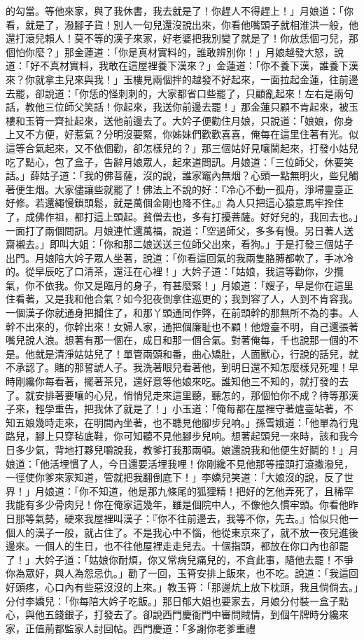 的勾當。等他來家，與了我休書，我去就是了！你趕人不得趕上！」月娘道：「你看，就是了，潑腳子貨！別人一句兒還沒說出來，你看他嘴頭子就相淮洪一般，他還打滾兒賴人！莫不等的漢子來家，好老婆把我別變了就是了！你放恁個刁兒，那個怕你麼？」那金蓮道：「你是真材實料的，誰敢辨別你！」月娘越發大怒，說道：「好不真材實料，我敢在這屋裡養下漢來？」金蓮道：「你不養下漢，誰養下漢來？你就拿主兒來與我！」玉樓見兩個拌的越發不好起來，一面拉起金蓮，往前邊去罷，卻說道：「你恁的怪刺刺的，大家都省口些罷了，只顧亂起來！左右是兩句話，教他三位師父笑話！你起來，我送你前邊去罷！」那金蓮只顧不肯起來，被玉樓和玉筲一齊扯起來，送他前邊去了。大妗子便勸住月娘，只說道：「娘娘，你身上又不方便，好惹氣？分明沒要緊，你姊妹們歡歡喜喜，俺每在這里住著有光。似這等合氣起來，又不依個勸，卻怎樣兒的？」那三個姑好見嚷鬧起來，打發小姑兒吃了點心，包了盒子，告辭月娘眾人，起來道問訊。月娘道：「三位師父，休要笑話。」薛姑子道：「我的佛菩薩，沒的說，誰家竈內無烟？心頭一點無明火，些兒觸著便生烟。大家儘讓些就罷了！佛法上不說的好：『冷心不動一孤舟，淨埽靈臺正好修。若還繩慢鎖頭鬆，就是萬個金剛也降不住。』為人只把這心猿意馬牢拴住了，成佛作祖，都打這上頭起。貧僧去也，多有打擾菩薩。好好兒的，我回去也。」一面打了兩個問訊。月娘連忙還萬福，說道：「空過師父，多多有慢。另日著人送齋襯去。」即叫大姐：「你和那二娘送送三位師父出來，看狗。」于是打發三個姑子出門。月娘陪大妗子眾人坐著，說道：「你看這回氣的我兩隻胳膊都軟了，手冰冷的。從早辰吃了口清茶，還汪在心裡！」大妗子道：「姑娘，我這等勸你，少攬氣，你不依我。你又是臨月的身子，有甚麼緊！」月娘道：「嫂子，早是你在這里住看著，又是我和他合氣？如今犯夜倒拿住巡更的；我到容了人，人到不肯容我。一個漢子你就通身把攔住了，和那丫頭通同作弊，在前頭幹的那無所不為的事。人幹不出來的，你幹出來！女婦人家，通把個廉耻也不顧！他燈臺不明，自己還張著嘴兒說人浪。想著有那一個在，成日和那一個合氣。對著俺每，千也說那一個的不是。他就是清淨姑姑兒了！單管兩頭和番，曲心矯肚，人面獸心，行說的話兒，就不承認了。賭的那誓諕人子。我洗著眼兒看著他，到明日還不知怎麼樣兒死哩！早時剛纔你每看著，擺著茶兒，還好意等他娘來吃。誰知他三不知的，就打發的去了。就安排著要嚷的心兒，悄悄兒走來這里聽，聽怎的，那個怕你不成？待等那漢子來，輕學重告，把我休了就是了！」小玉道：「俺每都在屋裡守著爐臺站著，不知五娘幾時走來，在明間內坐著，也不聽見他腳步兒响。」孫雪娥道：「他單為行鬼路兒，腳上只穿毡底鞋，你可知聽不見他腳步兒响。想著起頭兒一來時，該和我今日多少氣，背地打夥兒嚼說我，教爹打我那兩頓。娘還說我和他便生好鬬的！」月娘道：「他活埋慣了人，今日還要活埋我哩！你剛纔不見他那等撞頭打滾撒潑兒，一徑使你爹來家知道，管就把我翻倒底下！」李嬌兒笑道：「大娘沒的說，反了世界！」月娘道：「你不知道，他是那九條尾的狐狸精！把好的乞他弄死了，且稀罕我能有多少骨肉兒！你在俺家這幾年，雖是個院中人，不像他久慣牢頭。你看他昨日那等氣勢，硬來我屋裡叫漢子：『你不往前邊去，我等不你，先去。』恰似只他一個人的漢子一般，就占住了。不是我心中不惱，他從東京來了，就不放一夜兒進後邊來。一個人的生日，也不往他屋裡走走兒去。十個指頭，都放在你口內也卻罷了！」大妗子道：「姑娘你耐煩，你又常病兒痛兒的，不貪此事，隨他去罷！不爭你為眾好，與人為怨忌仇。」勸了一回，玉筲安排上飯來，也不吃。說道：「我這回好頭疼，心口內有些惡沒沒的上來。」教玉筲：「那邊炕上放下枕頭，我且倘倘去。」分付李嬌兒：「你每陪大妗子吃飯。」那日郁大姐也要家去，月娘分付裝一盒子點心，與他五錢銀子，打發去了。卻說西門慶衙門中審問賊情，到個午牌時分纔來家，正值荊都監家人討回帖。西門慶道：「多謝你老爹重禮